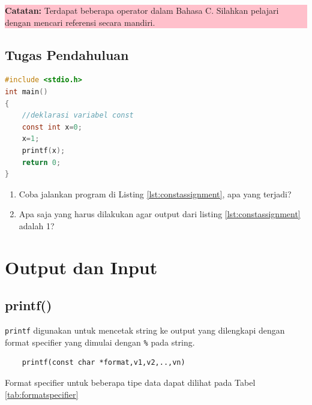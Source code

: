 \begin{center}
	\colorbox{pink}{\parbox{0.8\linewidth}{\textbf{Catatan:} Terdapat beberapa operator dalam Bahasa C. Silahkan pelajari dengan mencari referensi secara mandiri.}}
\end{center}

\subsection{Tugas Pendahuluan}
\begin{lstlisting}[language=c,caption=Menggunakan operator penugasan pada variabel const,label=lst:constassignment,captionpos=t]
#include <stdio.h>
int main()
{
    //deklarasi variabel const
    const int x=0;
    x=1;
	printf(x);
	return 0;
}
\end{lstlisting}
\begin{enumerate}
	\item Coba jalankan program di Listing \ref{lst:constassignment}, apa yang terjadi?
	\item Apa saja yang harus dilakukan agar output dari listing \ref{lst:constassignment} adalah 1?
\end{enumerate}

\section{Output dan Input}

\subsection{printf()}
\verb*|printf|  digunakan untuk mencetak string  ke output yang dilengkapi dengan format specifier yang dimulai dengan \verb*|%| pada string.

\begin{verbatim}
	printf(const char *format,v1,v2,..,vn)
\end{verbatim}

Format specifier untuk beberapa tipe data dapat dilihat pada Tabel \ref{tab:formatspecifier}


